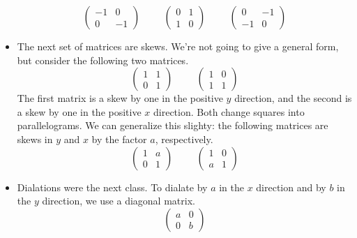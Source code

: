\documentclass[fleqn,letterpaper]{report}
\begin{document}
\begin{itemize}
\begin{equation*}
\left( \begin{matrix}
-1 & 0 \\ 0 & -1 
\end{matrix} \right) 
\hspace{1cm}
\left( \begin{matrix}
0 & 1 \\ 1 & 0 
\end{matrix} \right) 
\hspace{1cm}
\left( \begin{matrix}
0 & -1 \\ -1 & 0 
\end{matrix} \right) 
\end{equation*}
\item The next set of matrices are skews. We're not going to
give a general form, but consider the following two matrices.
\begin{equation*}
\left( \begin{matrix}
1 & 1 \\ 0 & 1 
\end{matrix} \right) 
\hspace{1cm}
\left( \begin{matrix}
1 & 0 \\ 1 & 1 
\end{matrix} \right) 
\end{equation*}
The first matrix is a skew by one in the positive $y$
direction, and the second is a skew by one in the positive $x$
direction. Both change squares into parallelograms. We can
generalize this slighty: the following matrices are skews in
$y$ and $x$ by the factor $a$, respectively.
\begin{equation*}
\left( \begin{matrix}
1 & a \\ 0 & 1 
\end{matrix} \right) 
\hspace{1cm}
\left( \begin{matrix}
1 & 0 \\ a & 1 
\end{matrix} \right) 
\end{equation*}
\item Dialations were the next class. To dialate by $a$ in the
$x$ direction and by $b$ in the $y$ direction, we use a
diagonal matrix.
\begin{equation*}
\left( \begin{matrix}
a & 0 \\ 0 & b 
\end{matrix} \right) 

\end{equation*}
\end{itemize}
\end{document}
